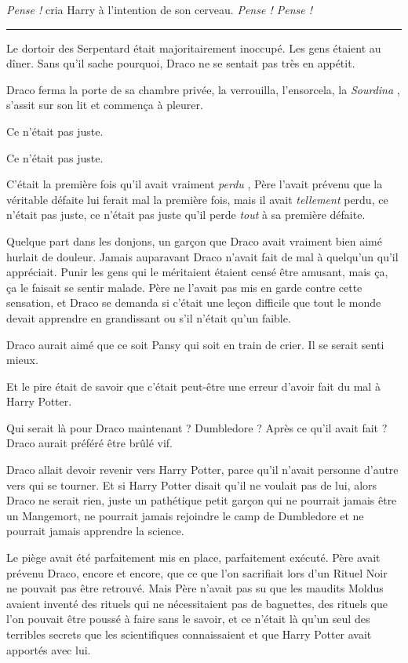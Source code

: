 \emph{Pense ! } cria Harry à l'intention de son cerveau. \emph{Pense ! Pense !} 
\par\noindent\rule{\textwidth}{0.4pt}
Le dortoir des Serpentard était majoritairement inoccupé. Les gens étaient au dîner. Sans qu'il sache pourquoi, Draco ne se sentait pas très en appétit.

Draco ferma la porte de sa chambre privée, la verrouilla, l'ensorcela, la \emph{Sourdina} , s'assit sur son lit et commença à pleurer.

Ce n'était pas juste.

Ce n'était pas juste.

C'était la première fois qu'il avait vraiment \emph{perdu} , Père l'avait prévenu que la véritable défaite lui ferait mal la première fois, mais il avait \emph{tellement}  perdu, ce n'était pas juste, ce n'était pas juste qu'il perde \emph{tout}  à sa première défaite.

Quelque part dans les donjons, un garçon que Draco avait vraiment bien aimé hurlait de douleur. Jamais auparavant Draco n'avait fait de mal à quelqu'un qu'il appréciait. Punir les gens qui le méritaient étaient censé être amusant, mais ça, ça le faisait se sentir malade. Père ne l'avait pas mis en garde contre cette sensation, et Draco se demanda si c'était une leçon difficile que tout le monde devait apprendre en grandissant ou s'il n'était qu'un faible.

Draco aurait aimé que ce soit Pansy qui soit en train de crier. Il se serait senti mieux.

Et le pire était de savoir que c'était peut-être une erreur d'avoir fait du mal à Harry Potter.

Qui serait là pour Draco maintenant ? Dumbledore ? Après ce qu'il avait fait ? Draco aurait préféré être brûlé vif.

Draco allait devoir revenir vers Harry Potter, parce qu'il n'avait personne d'autre vers qui se tourner. Et si Harry Potter disait qu'il ne voulait pas de lui, alors Draco ne serait rien, juste un pathétique petit garçon qui ne pourrait jamais être un Mangemort, ne pourrait jamais rejoindre le camp de Dumbledore et ne pourrait jamais apprendre la science.

Le piège avait été parfaitement mis en place, parfaitement exécuté. Père avait prévenu Draco, encore et encore, que ce que l'on sacrifiait lors d'un Rituel Noir ne pouvait pas être retrouvé. Mais Père n'avait pas su que les maudits Moldus avaient inventé des rituels qui ne nécessitaient pas de baguettes, des rituels que l'on pouvait être poussé à faire sans le savoir, et ce n'était là qu'un seul des terribles secrets que les scientifiques connaissaient et que Harry Potter avait apportés avec lui.

